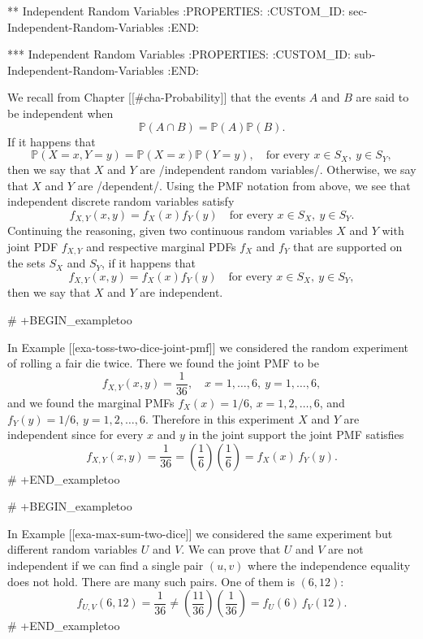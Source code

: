 ** Independent Random Variables
:PROPERTIES:
:CUSTOM_ID: sec-Independent-Random-Variables
:END:

*** Independent Random Variables
:PROPERTIES:
:CUSTOM_ID: sub-Independent-Random-Variables
:END:

We recall from Chapter [[#cha-Probability]] that the events \(A\) and \(B\) are
said to be independent when
\begin{equation}
\mathbb{P}(A\cap B)=\mathbb{P}(A)\mathbb{P}(B).
\end{equation}
If it happens that
\begin{equation}
\mathbb{P}(X=x,Y=y)=\mathbb{P}(X=x)\mathbb{P}(Y=y),\quad \mbox{for every }x\in S_{X},\ y\in S_{Y},
\end{equation}
then we say that \(X\) and \(Y\) are /independent random
variables/. Otherwise, we say that \(X\) and \(Y\) are
/dependent/. Using the PMF notation from above, we see that
independent discrete random variables satisfy
\begin{equation}
f_{X,Y}(x,y)=f_{X}(x)f_{Y}(y)\quad \mbox{for every }x\in S_{X},\ y\in S_{Y}.
\end{equation}
Continuing the reasoning, given two continuous random variables \(X\)
and \(Y\) with joint PDF \(f_{X,Y}\) and respective marginal PDFs
\(f_{X}\) and \(f_{Y}\) that are supported on the sets \(S_{X}\) and
\(S_{Y}\), if it happens that
\begin{equation}
f_{X,Y}(x,y)=f_{X}(x)f_{Y}(y)\quad \mbox{for every }x\in S_{X},\ y\in S_{Y},
\end{equation}
then we say that \(X\) and \(Y\) are independent.

# +BEGIN_exampletoo

In Example [[exa-toss-two-dice-joint-pmf]] we considered the random experiment of
rolling a fair die twice. There we found the joint PMF to be \[
f_{X,Y}(x,y)=\frac{1}{36},\quad x=1,\ldots,6,\ y=1,\ldots,6, \] and we
found the marginal PMFs \(f_{X}(x)=1/6\), \(x=1,2,\ldots,6\), and
\(f_{Y}(y)=1/6\), \(y=1,2,\ldots,6\). Therefore in this experiment
\(X\) and \(Y\) are independent since for every \(x\) and \(y\) in the
joint support the joint PMF satisfies \[
f_{X,Y}(x,y)=\frac{1}{36}=\left(\frac{1}{6}\right)\left(\frac{1}{6}\right)=f_{X}(x)\,
f_{Y}(y). \]
# +END_exampletoo


# +BEGIN_exampletoo

In Example [[exa-max-sum-two-dice]] we considered the same experiment but
different random variables \(U\) and \(V\). We can prove that \(U\)
and \(V\) are not independent if we can find a single pair \((u,v)\)
where the independence equality does not hold. There are many such
pairs. One of them is \((6,12)\): \[
f_{U,V}(6,12)=\frac{1}{36}\neq\left(\frac{11}{36}\right)\left(\frac{1}{36}\right)=f_{U}(6)\,
f_{V}(12).  \]
# +END_exampletoo


